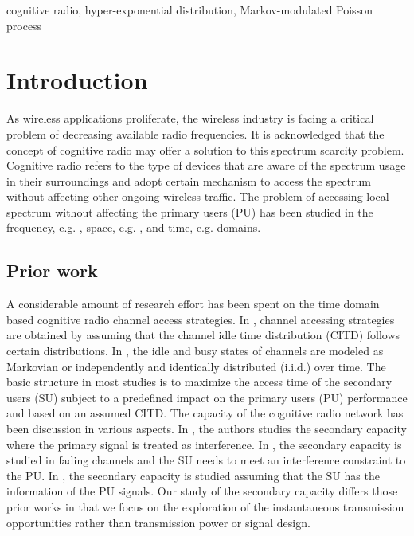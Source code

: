 \documentclass[10pt,final,journal,letterpaper]{IEEEtran}
\begin{document}
\begin{IEEEkeywords}
cognitive radio, hyper-exponential distribution, Markov-modulated Poisson process
\end{IEEEkeywords}

\IEEEpeerreviewmaketitle

\section{Introduction}
As wireless applications proliferate, the wireless industry is facing a critical problem of decreasing available radio frequencies. It is acknowledged that the concept of cognitive radio \cite{mitola1999cognitive} may offer a solution to this spectrum scarcity problem. Cognitive radio refers to the type of devices that are aware of the spectrum usage in their surroundings and adopt certain mechanism to access the spectrum without affecting other ongoing wireless traffic. The problem of accessing local spectrum without affecting the primary users (PU) has been studied in the frequency, e.g. \cite{ji2007cognitive}, space, e.g. \cite{win2009mathematical}, and time, e.g. \cite{huang2009optimal} domains.

\subsection{Prior work}
A considerable amount of research effort has been spent on the time domain based cognitive radio channel access strategies. In \cite{huang2009optimal, geirhofer2008cognitive}, channel accessing strategies are obtained by assuming that the channel idle time distribution (CITD) follows certain distributions. In \cite{zhao2007decentralized, lai2010cognitive}, the idle and busy states of channels are modeled as Markovian or independently and identically distributed (i.i.d.) over time. The basic structure in most studies is to maximize the access time of the secondary users (SU) subject to a predefined impact on the primary users (PU) performance and based on an assumed CITD. The capacity of the cognitive radio network has been discussion in various aspects. In \cite{4907431, 4373439}, the authors studies the secondary capacity where the primary signal is treated as interference. In \cite{4786456, 5419086}, the secondary capacity is studied in fading channels and the SU needs to meet an interference constraint to the PU. In \cite{4155368, 5208469}, the secondary capacity is studied assuming that the SU has the information of the PU signals. Our study of the secondary capacity differs those prior works in that we focus on the exploration of the instantaneous transmission opportunities rather than transmission power or signal design.
\end{document}
